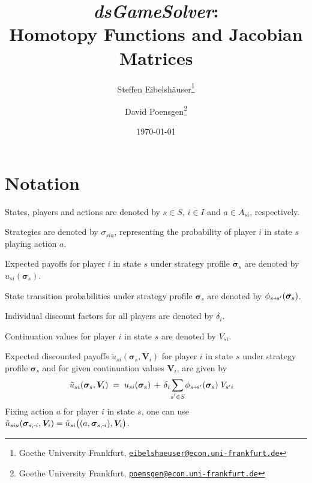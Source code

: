 \documentclass[11pt,fleqn]{article}
\newcommand{\bsigma}{\bm{\sigma}}
\newcommand{\bV}{\bm{V}}
\newcommand{\tu}{\tilde{u}}
\newcommand{\shortminus}{{\text{\scalebox{0.4}[1.0]{\(-\)}}}}
\newcommand{\minusi}{\shortminus i}
\newcommand{\shortrightarrow}{\parbox{4pt}{\tikz{\draw[->](0,0)--(4pt,0);}}}
\newcommand{\phiss}{\phi_{s\shortrightarrow s'}}
\begin{document}
\date{\today}
\title{\vspace{-2em}\Large
\textit{dsGameSolver}: \\ Homotopy Functions and Jacobian Matrices}
\author{
Steffen Eibelshäuser\footnote{Goethe University Frankfurt, \href{mailto:eibelshaeuser@econ.uni-frankfurt.de}{\nolinkurl{eibelshaeuser@econ.uni-frankfurt.de}}} %
\and %
David Poensgen\footnote{Goethe University Frankfurt, \href{mailto:poensgen@econ.uni-frankfurt.de}{\nolinkurl{poensgen@econ.uni-frankfurt.de}}}
}

\maketitle
\thispagestyle{empty}


\begin{spacing}{0.75}
\setcounter{secnumdepth}{2}
\tableofcontents
\thispagestyle{empty}
\end{spacing}
\null\vspace{2em}
\pagebreak




\section{Notation}

States, players and actions are denoted by $s\in S$, $i\in I$ and $a\in A_{si}$, respectively. 

Strategies are denoted by $\sigma_{sia}$, representing the probability of player $i$ in state $s$ playing action $a$. 

Expected payoffs for player $i$ in state $s$ under strategy profile $\bsigma_{s}$ are denoted by $u_{si}(\bsigma_{s})$. 

State transition probabilities under strategy profile $\bsigma_{s}$ are denoted by $\phiss(\bsigma_{s})$. 

Individual discount factors for all players are denoted by $\delta_i$.

Continuation values for player $i$ in state $s$ are denoted by $V_{si}$. 

Expected discounted payoffs $\tu_{si}(\bsigma_{s},\bV_i)$ for player $i$ in state $s$
under strategy profile $\bsigma_{s}$ and for given continuation values $\bV_i$, are given by
\begin{align*}
	\tu_{si}(\bsigma_{s},\bV_i) & \;=\; u_{si}(\bsigma_{s}) \,+\, \delta_i \sum\limits_{\mathclap{s'\in S}} \phiss(\bsigma_{s}) \; V_{s'i}
\end{align*}
Fixing action $a$ for player $i$ in state $s$, one can use $\tu_{sia}(\bsigma_{s,\minusi},\bV_i) = \tu_{si}\bigl((a,\bsigma_{s,\minusi}),\bV_i\bigr)$.
\end{document}
